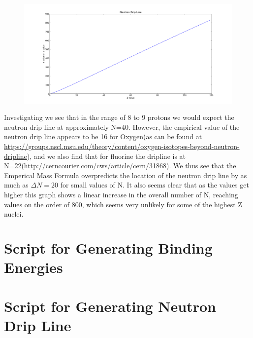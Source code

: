 \documentclass[11pt]{article} %
\begin{document}
\vspace{1mm}
\begin{figure}[h]
\centering
\includegraphics[width=\linewidth]{"NeutronDripLine"}
\end{figure}
\vspace{1mm}


Investigating we see that in the range of 8 to 9 protons we would expect the neutron drip line at approximately N=40. However, the empirical value of the neutron drip line appears to be 16 for Oxygen(as can be found at \url{https://groups.nscl.msu.edu/theory/content/oxygen-isotopes-beyond-neutron-dripline}), and we also find that for fluorine the dripline is at N=22(\url{http://cerncourier.com/cws/article/cern/31868}). We thus see that the Emperical Mass Formula overpredicts the location of the neutron drip line by as much as $\Delta N=20$ for small values of N. It also seems clear that as the values get higher this graph shows a linear increase in the overall number of N, reaching values on the order of 800, which seems very unlikely for some of the highest Z nuclei.  
\newpage
\section{Script for Generating Binding Energies}


\newpage
\section{Script for Generating Neutron Drip Line}

\end{document}
